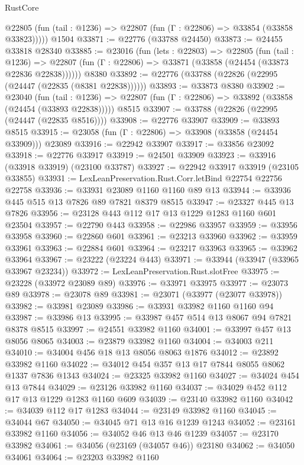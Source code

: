 \begin{lexlean}{RustCore}
\begin{coremodule}
      @22805 (fun (tail : @1236) => @22807 (fun (Γ : @22806) => @33854 (@33858 @33823)))))
    @1504
@33871 := @22776 (@33788 @24450)
@33873 := @24455 @33818 @28340
@33885 := @23016
    (fun (lets : @22803) =>
    @22805
      (fun (tail : @1236) =>
      @22807 (fun (Γ : @22806) => @33871 (@33858 (@24454 (@33873 @22836 @22838))))))
    @8380
@33892 := @22776 (@33788 (@22826 (@22995 (@24447 (@22835 (@8381 @22838))))))
@33893 := @33873 @8380
@33902 := @23040
    (fun (tail : @1236) => @22807 (fun (Γ : @22806) => @33892 (@33858 (@24454 (@33893 @22838)))))
    @8515
@33907 := @33788 (@22826 (@22995 (@24447 (@22835 @8516))))
@33908 := @22776 @33907
@33909 := @33893 @8515
@33915 := @23058 (fun (Γ : @22806) => @33908 (@33858 (@24454 @33909))) @23089
@33916 := @22942 @33907
@33917 := @33856 @23092
@33918 := @22776 @33917
@33919 := @24501 @33909
@33923 := @33916 (@33918 @33919) (@23100 @33787)
@33927 := @22942 @33917 @33919 (@23105 @33855)
@33931 := LexLeanPreservation.Rust.Corr.letBind @22754 @22756 @22758
@33936 := @33931 @23089 @1160 @1160 @89 @13
@33944 := @33936 @445 @515 @13 @7826 @89 @7821 @8379 @8515
@33947 := @23327 @445 @13 @7826
@33956 := @23128 @443 @112 @17 @13 @1229 @1283 @1160 @601 @23504
@33957 := @22790 @443
@33958 := @22986 @33957
@33959 := @33956 @33958
@33960 := @22860 @601
@33961 := @23213 @33960
@33962 := @33959 @33961
@33963 := @22884 @601
@33964 := @23217 @33963
@33965 := @33962 @33964
@33967 := @23222 (@23224 @443)
@33971 := @33944 (@33947 (@33965 @33967 @23234))
@33972 := LexLeanPreservation.Rust.slotFree
@33975 := @23228 (@33972 @23089 @89)
@33976 := @33971 @33975
@33977 := @23073 @89
@33978 := @23078 @89
@33981 := @23071 (@33977 (@23077 @33978))
@33982 := @33981 @23089
@33986 := @33931 @33982 @1160 @1160 @94
@33987 := @33986 @13
@33995 := @33987 @457 @514 @13 @8067 @94 @7821 @8378 @8515
@33997 := @24551 @33982 @1160
@34001 := @33997 @457 @13 @8056 @8065
@34003 := @23879 @33982 @1160
@34004 := @34003 @211
@34010 := @34004 @456 @18 @13 @8056 @8063 @1876
@34012 := @23892 @33982 @1160
@34022 := @34012 @454 @357 @13 @17 @7844 @8055 @8062 @1337 @7836 @1343
@34024 := @23325 @33982 @1160
@34027 := @34024 @454 @13 @7844
@34029 := @23126 @33982 @1160
@34037 := @34029 @452 @112 @17 @13 @1229 @1283 @1160 @609
@34039 := @23140 @33982 @1160
@34042 := @34039 @112 @17 @1283
@34044 := @23149 @33982 @1160
@34045 := @34044 @67
@34050 := @34045 @71 @13 @16 @1239 @1243
@34052 := @23161 @33982 @1160
@34056 := @34052 @46 @13 @46 @1239
@34057 := @23170 @33982
@34061 := @34056 (@23169 (@34057 @46)) @23180
@34062 := @34050 @34061
@34064 := @23203 @33982 @1160

\end{coremodule}
\end{lexlean}
